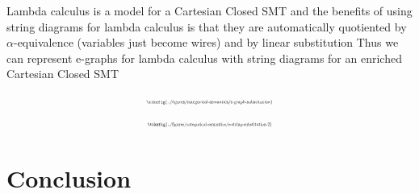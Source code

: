 \documentclass[aspectratio=169]{beamer}
\begin{document}
\begin{frame}{}
    \vfill
    Lambda calculus is a model for a Cartesian Closed SMT and the benefits of using string diagrams for lambda calculus is that they are automatically quotiented by $\alpha$-equivalence (variables just become wires) and by linear substitution
    \vfill
    Thus we can represent e-graphs for lambda calculus with string diagrams for an enriched Cartesian Closed SMT
\end{frame}

\begin{frame}
    \[
        \scalebox{0.4}{
        \tikzfig{../figures/categorical-semantics/e-graph-substitution}
        }
    \]
    \[
        \scalebox{0.38}{
        \tikzfig{../figures/categorical-semantics/e-string-substitution-2}
        }
    \]
\end{frame}

\section{Conclusion}
\end{document}

